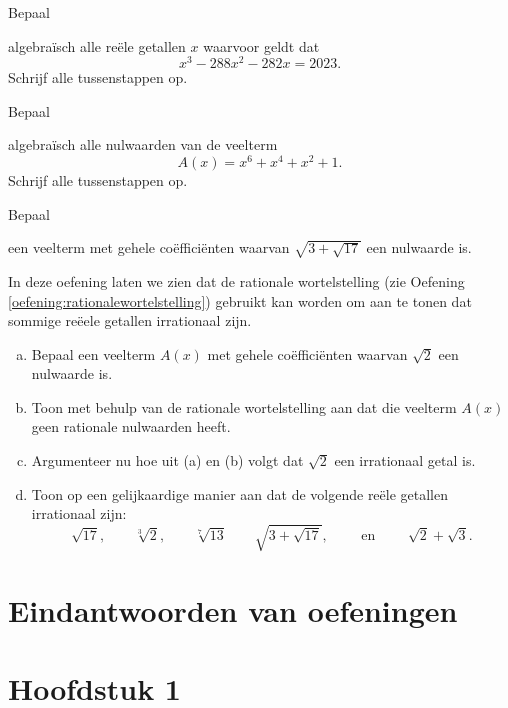 \documentclass{ximera}
\begin{document}
\begin{Oefening}\setcounter{enumi}{17} 
\hypertarget{oef4.17}{Bepaal} algebra\"isch alle re\"ele getallen $x$ waarvoor geldt dat 
\[
x^3-288x^2-282x  = 2023.
\]
Schrijf alle tussenstappen op.
\end{Oefening}

\begin{Oefening}\setcounter{enumi}{18} 
\hypertarget{oef4.18}{Bepaal} algebra\"isch alle nulwaarden van de veelterm
\[
A(x) = x^6 + x^4 + x^2 + 1.
\]
Schrijf alle tussenstappen op.
\end{Oefening}

\begin{Oefening}\setcounter{enumi}{19} 
\hypertarget{oef4.19}{Bepaal} een veelterm met gehele co\"effici\"enten waarvan $\sqrt{3+\sqrt{17}}$ een nulwaarde is.
\end{Oefening}

\begin{Uitbreiding}
\begin{Oefening}
In deze oefening laten we zien dat de rationale wortelstelling (zie Oefening \ref{oefening:rationalewortelstelling}) gebruikt kan worden om aan te tonen dat sommige re\"eele getallen irrationaal zijn.
\begin{enumerate}[(a)]
\item
Bepaal een veelterm $A(x)$ met gehele co\"effici\"enten waarvan $\sqrt{2}$ een nulwaarde is.
\item
Toon met behulp van de rationale wortelstelling aan dat die veelterm $A(x)$ geen rationale nulwaarden heeft.
\item
Argumenteer nu hoe uit (a) en (b) volgt dat $\sqrt{2}$ een irrationaal getal is.
\item
Toon op een gelijkaardige manier aan dat de volgende re\"ele getallen irrationaal zijn:
\[
\sqrt{17}, \qquad \sqrt[3]{2}, \qquad \sqrt[7]{13} \qquad \sqrt{3+\sqrt{17}}, 
\qquad \text{ en } \qquad \sqrt{2}+\sqrt{3}.
\]
\end{enumerate}
\end{Oefening}
\end{Uitbreiding}

\clearpage

\section{Eindantwoorden van oefeningen}
\section*{Hoofdstuk 1}
\end{document}
